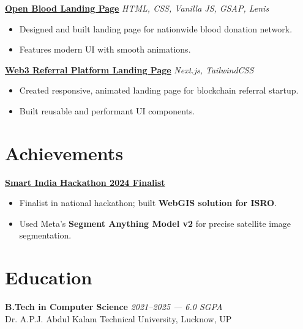 \documentclass[a4paper,10pt]{article}
\begin{document}
\noindent\textbf{\href{https://landing-theta-red-48.vercel.app/}{Open Blood Landing Page}} \hfill \textit{HTML, CSS, Vanilla JS, GSAP, Lenis}
\begin{itemize}
  \item Designed and built landing page for nationwide blood donation network.
  \item Features modern UI with smooth animations.
\end{itemize}
\vspace{0.4em}

\noindent\textbf{\href{https://web3-referral-landing.vercel.app/}{Web3 Referral Platform Landing Page}} \hfill \textit{Next.js, TailwindCSS}
\begin{itemize}
  \item Created responsive, animated landing page for blockchain referral startup.
  \item Built reusable and performant UI components.
\end{itemize}
\vspace{0.4em}

\section*{Achievements}

\noindent\textbf{\href{https://www.linkedin.com/posts/rohiitcodes_smart-india-hackathon-was-a-fabulous-experience-activity-7274397856336101376-Rh_Q?utm_source=share&utm_medium=member_desktop}{Smart India Hackathon 2024 Finalist}}
\begin{itemize}
  \item Finalist in national hackathon; built \textbf{WebGIS solution for ISRO}.
  \item Used Meta’s \textbf{Segment Anything Model v2} for precise satellite image segmentation.
\end{itemize}
\vspace{0.4em}


\section*{Education}
\noindent\textbf{B.Tech in Computer Science} \hfill \textit{2021–2025 — 6.0 SGPA} \\
Dr. A.P.J. Abdul Kalam Technical University, Lucknow, UP
\end{document}
